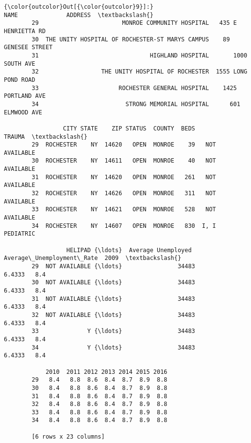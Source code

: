 \documentclass[11pt]{article}
\begin{document}
\begin{Verbatim}[commandchars=\\\{\}]
{\color{outcolor}Out[{\color{outcolor}9}]:}                                                NAME              ADDRESS  \textbackslash{}
        29                        MONROE COMMUNITY HOSPITAL   435 E HENRIETTA RD   
        30  THE UNITY HOSPITAL OF ROCHESTER-ST MARYS CAMPUS    89 GENESEE STREET   
        31                                HIGHLAND HOSPITAL       1000 SOUTH AVE   
        32                  THE UNITY HOSPITAL OF ROCHESTER  1555 LONG POND ROAD   
        33                       ROCHESTER GENERAL HOSPITAL    1425 PORTLAND AVE   
        34                         STRONG MEMORIAL HOSPITAL      601 ELMWOOD AVE   
        
                 CITY STATE    ZIP STATUS  COUNTY  BEDS          TRAUMA  \textbackslash{}
        29  ROCHESTER    NY  14620   OPEN  MONROE    39   NOT AVAILABLE   
        30  ROCHESTER    NY  14611   OPEN  MONROE    40   NOT AVAILABLE   
        31  ROCHESTER    NY  14620   OPEN  MONROE   261   NOT AVAILABLE   
        32  ROCHESTER    NY  14626   OPEN  MONROE   311   NOT AVAILABLE   
        33  ROCHESTER    NY  14621   OPEN  MONROE   528   NOT AVAILABLE   
        34  ROCHESTER    NY  14607   OPEN  MONROE   830  I, I PEDIATRIC   
        
                  HELIPAD {\ldots}  Average Unemployed   Average\_Unemployment\_Rate  2009  \textbackslash{}
        29  NOT AVAILABLE {\ldots}                34483                     6.4333   8.4   
        30  NOT AVAILABLE {\ldots}                34483                     6.4333   8.4   
        31  NOT AVAILABLE {\ldots}                34483                     6.4333   8.4   
        32  NOT AVAILABLE {\ldots}                34483                     6.4333   8.4   
        33              Y {\ldots}                34483                     6.4333   8.4   
        34              Y {\ldots}                34483                     6.4333   8.4   
        
            2010  2011 2012 2013 2014 2015 2016  
        29   8.4   8.8  8.6  8.4  8.7  8.9  8.8  
        30   8.4   8.8  8.6  8.4  8.7  8.9  8.8  
        31   8.4   8.8  8.6  8.4  8.7  8.9  8.8  
        32   8.4   8.8  8.6  8.4  8.7  8.9  8.8  
        33   8.4   8.8  8.6  8.4  8.7  8.9  8.8  
        34   8.4   8.8  8.6  8.4  8.7  8.9  8.8  
        
        [6 rows x 23 columns]
\end{Verbatim}
            
\end{document}
